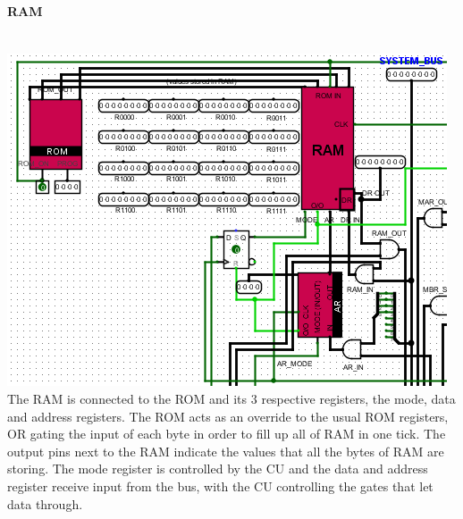 \documentclass{mcgillhomework}
\begin{document}
	\paragraph{RAM}~
	\\ \includegraphics[scale=0.5]{RAM} \\The RAM is connected to the ROM and its $3$ respective registers, the mode, data and address registers. The ROM acts as an override to the usual ROM registers, OR gating the input of each byte in order to fill up all of RAM in one tick. The output pins next to the RAM indicate the values that all the bytes of RAM are storing. The mode register is controlled by the CU and the data and address register receive input from the bus, with the CU controlling the gates that let data through.
\end{document}
